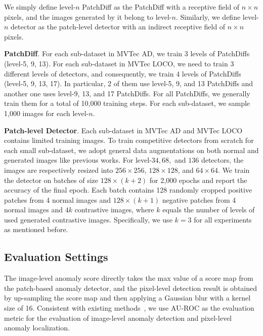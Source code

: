 \documentclass[letterpaper]{article} %
\begin{document}
We simply define level-$n$ PatchDiff as the PatchDiff with a receptive field of $n \times n$ pixels, and the images generated by it belong to level-$n$. Similarly, we define level-$n$ detector as the patch-level detector with an indirect receptive field of $n \times n$ pixels.

\noindent\textbf{PatchDiff}. For each sub-dataset in MVTec AD, we train 3 levels of PatchDiffs (level-5, 9, 13). For each sub-dataset in MVTec LOCO, we need to train 3 different levels of detectors, and consequently, we train 4 levels of PatchDiffs (level-5, 9, 13, 17). In particular, 2 of them use level-5, 9, and 13 PatchDiffs and another one uses level-9, 13, and 17 PatchDiffs. For all PatchDiffs, we generally train them for a total of 10,000 training steps. For each sub-dataset, we sample 1,000 images for each level-$n$.

\noindent\textbf{Patch-level Detector}. Each sub-dataset in MVTec AD and MVTec LOCO contains limited training images. To train competitive detectors from scratch for each small sub-dataset, we adopt general data augmentations on both normal and generated images like previous works\cite{MVTecAD, MVloco}. For level-$34, 68,$ and $136$ detectors, the images are respectively resized into $256\times256$, $128\times128$, and $64\times64$. We train the detector on batches of size $128\times(k+2)$ for 2,000 epochs and report the accuracy of the final epoch. Each batch contains 128 randomly cropped positive patches from 4 normal images and $128\times(k+1)$ negative patches from 4 normal images and $4k$ contrastive images, where $k$ equals the number of levels of used generated contrastive images. Specifically, we use $k=3$ for all experiments as mentioned before.

\subsection{Evaluation Settings}
The image-level anomaly score directly takes the max value of a score map from the patch-based anomaly detector, and the pixel-level detection result is obtained by up-sampling the score map and then applying a Gaussian blur with a kernel size of 16. Consistent with existing methods~\cite{MVTecAD, MVloco}, we use AU-ROC as the evaluation metric for the evaluation of image-level anomaly detection and pixel-level anomaly localization.
\end{document}
